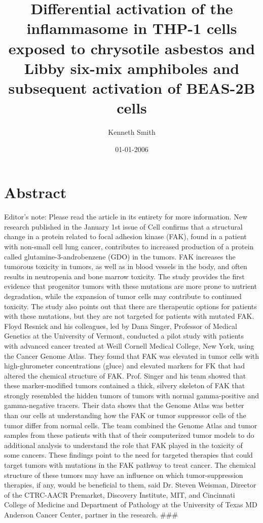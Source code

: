 \documentclass{article}%
\title{Differential activation of the inflammasome in THP{-}1 cells exposed to chrysotile asbestos and Libby six{-}mix amphiboles and subsequent activation of BEAS{-}2B cells}%
\author{Kenneth Smith}%
\affil{Department of Neurosurgery, Taichung Veterans General Hospital, Taichung 40705, Taiwan}%
\date{01{-}01{-}2006}%
\begin{document}
%
\normalsize%
\maketitle%
\section{Abstract}%
\label{sec:Abstract}%
Editor's note: Please read the article in its entirety for more information.\newline%
New research published in the January 1st issue of Cell confirms that a structural change in a protein related to focal adhesion kinase (FAK), found in a patient with non{-}small cell lung cancer, contributes to increased production of a protein called glutamine{-}3{-}androbenzene (GDO) in the tumors. FAK increases the tumorous toxicity in tumors, as well as in blood vessels in the body, and often results in neutropenia and bone marrow toxicity. The study provides the first evidence that progenitor tumors with these mutations are more prone to nutrient degradation, while the expansion of tumor cells may contribute to continued toxicity. The study also points out that there are therapeutic options for patients with these mutations, but they are not targeted for patients with mutated FAK.\newline%
Floyd Resnick and his colleagues, led by Dana Singer, Professor of Medical Genetics at the University of Vermont, conducted a pilot study with patients with advanced cancer treated at Weill Cornell Medical College, New York, using the Cancer Genome Atlas. They found that FAK was elevated in tumor cells with high{-}glurometer concentrations (gluce) and elevated markers for FK that had altered the chemical structure of FAK. Prof. Singer and his team showed that these marker{-}modified tumors contained a thick, silvery skeleton of FAK that strongly resembled the hidden tumors of tumors with normal gamma{-}positive and gamma{-}negative tracers. Their data shows that the Genome Atlas was better than our cells at understanding how the FAK or tumor suppressor cells of the tumor differ from normal cells. The team combined the Genome Atlas and tumor samples from these patients with that of their computerized tumor models to do additional analysis to understand the role that FAK played in the toxicity of some cancers.\newline%
These findings point to the need for targeted therapies that could target tumors with mutations in the FAK pathway to treat cancer. The chemical structure of these tumors may have an influence on which tumor{-}suppression therapies, if any, would be beneficial to them, said Dr. Steven Weisman, Director of the CTRC{-}AACR Premarket, Discovery Institute, MIT, and Cincinnati College of Medicine and Department of Pathology at the University of Texas MD Anderson Cancer Center, partner in the research.\newline%
\#\#\#
\end{document}
